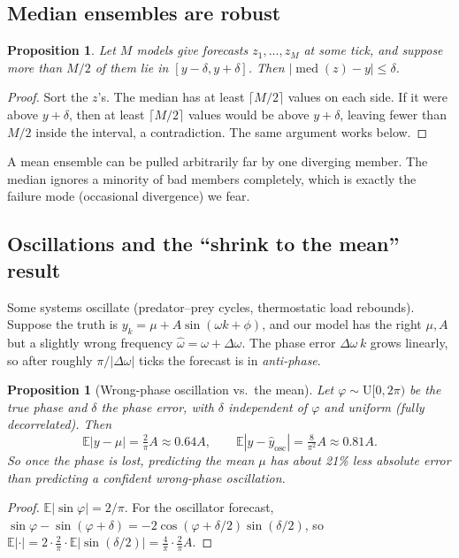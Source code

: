 \documentclass[11pt]{article}
\theoremstyle{plain}
\newtheorem{proposition}[theorem]{Proposition}
\theoremstyle{definition}
\theoremstyle{remark}
\newcommand{\E}{\mathbb{E}}
\newcommand{\abs}[1]{\left\lvert #1 \right\rvert}
\DeclareMathOperator{\med}{med}
\begin{document}
\subsection{Median ensembles are robust}
\begin{proposition}\label{prop:median}
Let $M$ models give forecasts $z_1,\dots,z_M$ at some tick, and suppose more than $M/2$ of them lie in $[y-\delta,y+\delta]$. Then $\abs{\med(z)-y}\le\delta$.
\end{proposition}
\begin{proof}
Sort the $z$'s. The median has at least $\lceil M/2\rceil$ values on each side. If it were above $y+\delta$, then at least $\lceil M/2\rceil$ values would be above $y+\delta$, leaving fewer than $M/2$ inside the interval, a contradiction. The same argument works below.
\end{proof}
A mean ensemble can be pulled arbitrarily far by one diverging member. The median ignores a minority of bad members completely, which is exactly the failure mode (occasional divergence) we fear.

\subsection{Oscillations and the ``shrink to the mean'' result}\label{sec:osc}
Some systems oscillate (predator--prey cycles, thermostatic load rebounds). Suppose the truth is $y_k=\mu+A\sin(\omega k+\phi)$, and our model has the right $\mu,A$ but a slightly wrong frequency $\hat\omega=\omega+\Delta\omega$. The phase error $\Delta\omega\,k$ grows linearly, so after roughly $\pi/\abs{\Delta\omega}$ ticks the forecast is in \emph{anti-phase}.

\begin{proposition}[Wrong-phase oscillation vs.\ the mean]\label{prop:phase}
Let $\varphi\sim\mathrm U[0,2\pi)$ be the true phase and $\delta$ the phase error, with $\delta$ independent of $\varphi$ and uniform (fully decorrelated). Then
\[
\E\abs{y-\mu}=\tfrac{2}{\pi}A\approx0.64A,\qquad \E\abs{y-\hat y_{\text{osc}}}=\tfrac{8}{\pi^2}A\approx0.81A.
\]
So once the phase is lost, predicting the mean $\mu$ has about 21\% less absolute error than predicting a confident wrong-phase oscillation.
\end{proposition}
\begin{proof}
$\E\abs{\sin\varphi}=2/\pi$. For the oscillator forecast, $\sin\varphi-\sin(\varphi+\delta)=-2\cos(\varphi+\delta/2)\sin(\delta/2)$, so $\E\abs{\cdot}=2\cdot\frac{2}{\pi}\cdot\E\abs{\sin(\delta/2)}=\frac4\pi\cdot\frac2\pi A$.
\end{proof}
\end{document}
